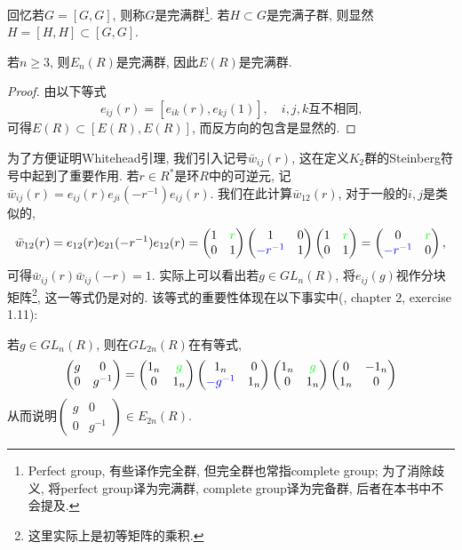 回忆若$G=[G,G]$, 则称$G$是完满群\footnote{Perfect group, 有些译作完全群, 但完全群也常指complete group; 为了消除歧义, 将perfect group译为完满群, complete group译为完备群, 后者在本书中不会提及.}.
若$H\subset G$是完满子群, 则显然$H=[H,H]\subset [G,G]$. 
\begin{lemma}
\label{lem:ERperfect}
 	若$n\geq 3$, 则$E_n(R)$是完满群, 因此$E(R)$是完满群.
\end{lemma} 
\begin{proof}
	由以下等式
	\[e_{ij}(r)=[e_{ik}(r),e_{kj}(1)], \quad \text{$i,j,k$互不相同,}\]
	可得$E(R)\subset [E(R),E(R)]$, 而反方向的包含是显然的.
\end{proof}
为了方便证明Whitehead引理, 我们引入记号$\bar{w}_{ij}(r)$, 这在定义$K_2$群的Steinberg符号中起到了重要作用.
若$r\in R^*$是环$R$中的可逆元, 记$\bar{w}_{ij}(r)=e_{ij}(r)e_{ji}(-r^{-1})e_{ij}(r)$. 我们在此计算$\bar{w}_{12}(r)$, 对于一般的$i,j$是类似的,
\[\bar{w}_{12}(r)=e_{12}(r)e_{21}(-r^{-1})e_{12}(r)=\begin{pmatrix}
	1 & {\color{green}r}\\ 0 & 1
\end{pmatrix}\begin{pmatrix}
	1 & 0\\ {\color{blue}-r^{-1}} & 1
\end{pmatrix}\begin{pmatrix}
	1 & {\color{green}r}\\ 0 & 1
\end{pmatrix}=\begin{pmatrix}
	0 & {\color{green}r}\\ {\color{blue}-r^{-1}}  & 0
\end{pmatrix},\]
可得$\bar{w}_{ij}(r)\bar{w}_{ij}(-r)=1$.
实际上可以看出若$g\in GL_n(R)$, 将$e_{ij}(g)$视作分块矩阵\footnote{这里实际上是初等矩阵的乘积.}, 这一等式仍是对的.
该等式的重要性体现在以下事实中(\cite{weibel2013k}, chapter 2, exercise 1.11):
\begin{lemma}
\label{lem:gginverse}
	若$g\in GL_n(R)$, 则在$GL_{2n}(R)$在有等式,
	\[\begin{pmatrix}
	g & 0\\ 0 & g^{-1}
\end{pmatrix}=\begin{pmatrix}
	1_n & {\color{green}g}\\ 0 & 1_n
\end{pmatrix}\begin{pmatrix}
	1_n & 0\\ {\color{blue}-g^{-1}} & 1_n
\end{pmatrix}\begin{pmatrix}
	1_n & {\color{green}g}\\ 0 & 1_n
\end{pmatrix}\begin{pmatrix}
	0 & -1_n\\ 1_n & 0
\end{pmatrix}\]
	从而说明$\begin{pmatrix}
		g & 0\\ 0 & g^{-1}
	\end{pmatrix}\in E_{2n}(R)$.
\end{lemma}
